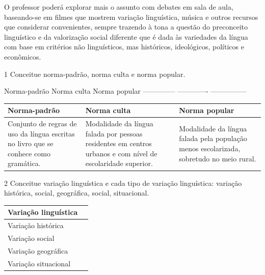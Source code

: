 O professor poderá explorar mais o assunto com debates em sala de aula,
baseando-se em filmes que mostrem variação linguística, música e outros
recursos que considerar convenientes, sempre trazendo à tona a questão
do preconceito linguístico e da valorização social diferente que é dada
às variedades da língua com base em critérios não linguísticos, mas
históricos, ideológicos, políticos e econômicos.


\num{1} Conceitue norma-padrão, norma culta e norma popular.

Norma-padrão Norma culta Norma popular -------------- -------------
---------------

\begin{longtable}[]{@{}lll@{}}
\toprule
Norma-padrão & Norma culta & Norma popular\tabularnewline
\midrule
\endhead
Conjunto de regras de uso da língua escritas no livro que se conhece
como gramática. & Modalidade da língua falada por pessoas residentes em
centros urbanos e com nível de escolaridade superior. & Modalidade da
língua falada pela população menos escolarizada, sobretudo no meio
rural.\tabularnewline
\bottomrule
\end{longtable}

\num{2} Conceitue variação linguística e cada tipo de variação
linguística: variação histórica, social, geográfica, social,
situacional.

\begin{longtable}[]{@{}ll@{}}
\toprule
Variação linguística &\tabularnewline
\midrule
\endhead
Variação histórica &\tabularnewline
Variação social &\tabularnewline
Variação geográfica &\tabularnewline
Variação situacional &\tabularnewline
\bottomrule
\end{longtable}

